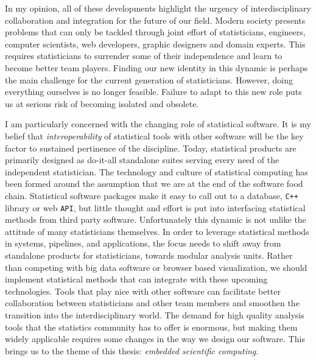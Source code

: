 In my opinion, all of these developments highlight the urgency of interdisciplinary collaboration and integration for the future of our field. Modern society presents problems that can only be tackled through joint effort of statisticians, engineers, computer scientists, web developers, graphic designers and domain experts. This requires statisticians to surrender some of their independence and learn to become better team players. Finding our new identity in this dynamic is perhaps the main challenge for the current generation of statisticians. However, doing everything ourselves is no longer feasible. Failure to adapt to this new role puts us at serious risk of becoming isolated and obsolete.

I am particularly concerned with the changing role of statistical software. It is my belief that \emph{interoperability} of statistical tools with other software will be the key factor to sustained pertinence of the discipline. Today, statistical products are primarily designed as do-it-all standalone suites serving every need of the independent statistician. The technology and culture of statistical computing has been formed around the assumption that we are at the end of the software food chain. Statistical software packages make it easy to call out to a database, \texttt{C++} library or web \texttt{API}, but little thought and effort is put into interfacing statistical methods from third party software. Unfortunately this dynamic is not unlike the attitude of many statisticians themselves. In order to leverage statistical methods in systems, pipelines, and applications, the focus needs to shift away from standalone products for statisticians, towards modular analysis units. Rather than competing with big data software or browser based visualization, we should implement statistical methods that can integrate with these upcoming technologies. Tools that play nice with other software can facilitate better collaboration between statisticians and other team members and smoothen the transition into the interdisciplinary world. The demand for high quality analysis tools that the statistics community has to offer is enormous, but making them widely applicable requires some changes in the way we design our software. This brings us to the theme of this thesis: \emph{embedded scientific computing}. 


